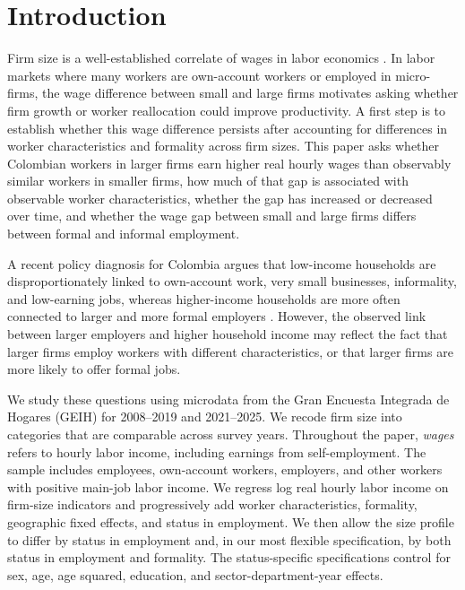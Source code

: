 \section{Introduction}

Firm size is a well-established correlate of wages in labor economics \citep{BrownMedoff1989,OiIdson1999,troske1999evidence}. In labor markets where many workers are own-account workers or employed in micro-firms, the wage difference between small and large firms motivates asking whether firm growth or worker reallocation could improve productivity. A first step is to establish whether this wage difference persists after accounting for differences in worker characteristics and formality across firm sizes. This paper asks whether Colombian workers in larger firms earn higher real hourly wages than observably similar workers in smaller firms, how much of that gap is associated with observable worker characteristics, whether the gap has increased or decreased over time, and whether the wage gap between small and large firms differs between formal and informal employment.

A recent policy diagnosis for Colombia argues that low-income households are disproportionately linked to own-account work, very small businesses, informality, and low-earning jobs, whereas higher-income households are more often connected to larger and more formal employers \citep{eslava2026crecimiento}. %
However, the observed link between larger employers and higher household income may reflect the fact that larger firms employ workers with different characteristics, or that larger firms are more likely to offer formal jobs.

We study these questions using microdata from the Gran Encuesta Integrada de Hogares (GEIH) for 2008--2019 and 2021--2025. We recode firm size into categories that are comparable across survey years. Throughout the paper, \emph{wages} refers to hourly labor income, including earnings from self-employment. The sample includes employees, own-account workers, employers, and other workers with positive main-job labor income. We regress log real hourly labor income on firm-size indicators and progressively add worker characteristics, formality, geographic fixed effects, and status in employment. We then allow the size profile to differ by status in employment and, in our most flexible specification, by both status in employment and formality. The status-specific specifications control for sex, age, age squared, education, and sector-department-year effects.

